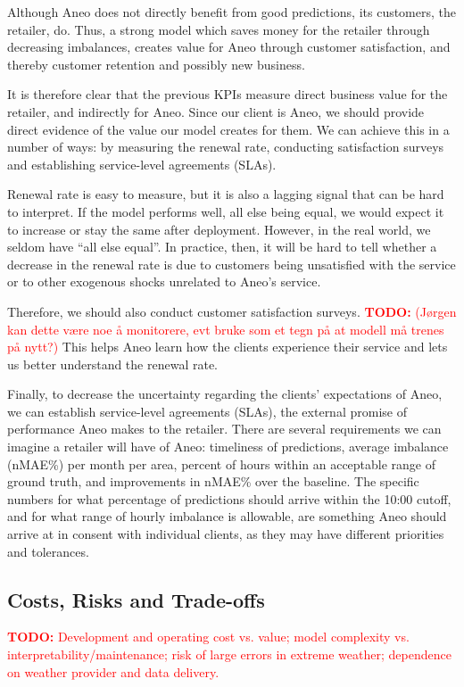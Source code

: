 \documentclass[11pt,a4paper]{article}
\newcommand{\todo}[1]{\textcolor{red}{\textbf{TODO:} #1}}
\begin{document}
Although Aneo does not directly benefit from good predictions, its customers, the retailer, do. Thus, a strong model which saves money for the retailer through decreasing imbalances, creates value for Aneo through customer satisfaction, and thereby customer retention and possibly new business.

It is therefore clear that the previous KPIs measure direct business value for the retailer, and indirectly for Aneo. Since our client is Aneo, we should provide direct evidence of the value our model creates for them. We can achieve this in a number of ways: by measuring the renewal rate, conducting satisfaction surveys and establishing service-level agreements (SLAs).

Renewal rate is easy to measure, but it is also a lagging signal that can be hard to interpret. If the model performs well, all else being equal, we would expect it to increase or stay the same after deployment. However, in the real world, we seldom have ``all else equal''. In practice, then, it will be hard to tell whether a decrease in the renewal rate is due to customers being unsatisfied with the service or to other exogenous shocks unrelated to Aneo's service.

Therefore, we should also conduct customer satisfaction surveys. \todo{(Jørgen kan dette være noe å monitorere, evt bruke som et tegn på at modell må trenes på nytt?)} This helps Aneo learn how the clients experience their service and lets us better understand the renewal rate.

Finally, to decrease the uncertainty regarding the clients' expectations of Aneo, we can establish service-level agreements (SLAs), the external promise of performance Aneo makes to the retailer. There are several requirements we can imagine a retailer will have of Aneo: timeliness of predictions, average imbalance (nMAE\%) per month per area, percent of hours within an acceptable range of ground truth, and improvements in nMAE\% over the baseline. The specific numbers for what percentage of predictions should arrive within the 10:00 cutoff, and for what range of hourly imbalance is allowable, are something Aneo should arrive at in consent with individual clients, as they may have different priorities and tolerances.

\subsection{Costs, Risks and Trade-offs}
\todo{Development and operating cost vs. value; model complexity vs. interpretability/maintenance; risk of large errors in extreme weather; dependence on weather provider and data delivery.}
\end{document}
